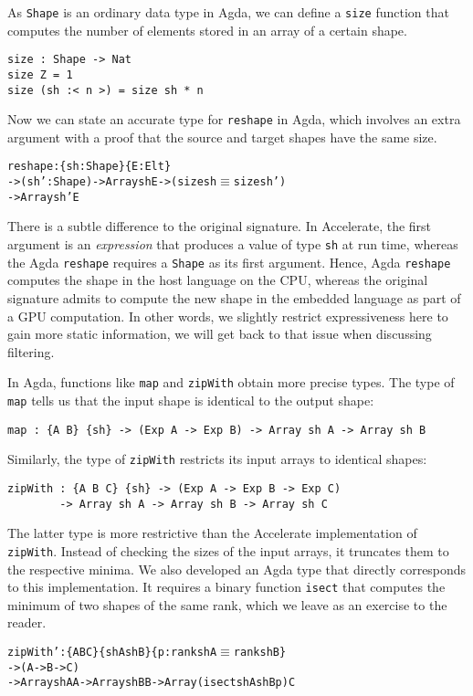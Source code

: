 \documentclass{llncs}
\begin{document}
As \texttt{Shape} is an ordinary data type in Agda, we can define a
\texttt{size} function that computes the number of elements stored in
an array of a certain shape.
\begin{verbatim}
size : Shape -> Nat
size Z = 1
size (sh :< n >) = size sh * n
\end{verbatim}
Now we can state an accurate type for \texttt{reshape} in Agda, which
involves an extra argument with a proof that the source and
target shapes have the same size.
\begin{alltt}
reshape : \{sh : Shape\} \{E : Elt\}
       -> (sh' : Shape) -> Array sh E -> (size sh \(\equiv\) size sh')
       -> Array sh' E
\end{alltt}
There is a subtle difference to the original signature. In
Accelerate, the first argument is an \emph{expression} that produces a
value of type \texttt{sh} at run time, whereas the Agda
\texttt{reshape} requires a \texttt{Shape} as its first argument. Hence, 
Agda \texttt{reshape} computes the shape in the host language on the CPU,
whereas the original signature admits to compute the new shape in the
embedded language as part of a GPU computation. In other words, we slightly
restrict expressiveness here to gain more static information, we will get
back to that issue when discussing filtering.

In Agda, functions like \texttt{map} and \texttt{zipWith} obtain
more precise types. The type of \texttt{map} tells us that the input
shape is identical to the output shape:
\begin{verbatim}
map : {A B} {sh} -> (Exp A -> Exp B) -> Array sh A -> Array sh B
\end{verbatim}
Similarly, the type of \texttt{zipWith} restricts its input arrays to
identical shapes:
\begin{verbatim}
zipWith : {A B C} {sh} -> (Exp A -> Exp B -> Exp C)
        -> Array sh A -> Array sh B -> Array sh C
\end{verbatim}
The latter type is more restrictive than the Accelerate implementation
of \texttt{zipWith}. Instead of checking the sizes of the input
arrays, it truncates them to the respective minima. We also developed
an Agda type that directly corresponds to this implementation. It
requires a binary function \texttt{isect} that computes the minimum of
two shapes of the same rank,
which we leave as an exercise to the reader.
\begin{alltt}
zipWith' : \{A B C\} \{shA shB\} \{p : rank shA \(\equiv\) rank shB\}
         -> (A -> B -> C)
         -> Array shA A -> Array shB B -> Array (isect shA shB p) C
\end{alltt}
\end{document}
